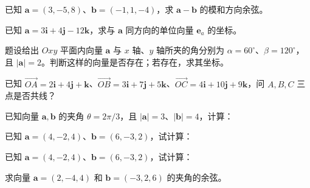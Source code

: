\noindent\begin{minipage}{\textwidth}
已知 $\mathbf a=(3,-5,8)$、$\mathbf b=(-1,1,-4)$，求 $\mathbf a-\mathbf b$ 的模和方向余弦。
\end{minipage}\par\vfill
\newpage
\noindent\begin{minipage}{\textwidth}
已知 $\mathbf a=3\mathbf i+4\mathbf j-12\mathbf k$，求与 $\mathbf a$ 同方向的单位向量 $\mathbf e_a$ 的坐标。
\end{minipage}\par\vfill
\noindent\begin{minipage}{\textwidth}
题设给出 $Oxy$ 平面内向量 $\mathbf a$ 与 $x$ 轴、$y$ 轴所夹的角分别为 $\alpha=60^\circ$、$\beta=120^\circ$，且 $|\mathbf a|=2$。判断这样的向量是否存在；若存在，求其坐标。
\end{minipage}\par\vfill
\noindent\begin{minipage}{\textwidth}
已知 $\overrightarrow{OA}=2\mathbf i+4\mathbf j+\mathbf k$、$\overrightarrow{OB}=3\mathbf i+7\mathbf j+5\mathbf k$、$\overrightarrow{OC}=4\mathbf i+10\mathbf j+9\mathbf k$，问 $A,B,C$ 三点是否共线？
\end{minipage}\par\vfill
\noindent\begin{minipage}{\textwidth}
已知向量 $\mathbf a,\mathbf b$ 的夹角 $\theta=2\pi/3$，且 $|\mathbf a|=3$、$|\mathbf b|=4$，计算：
\end{minipage}\par\vfill
\newpage
\noindent\begin{minipage}{\textwidth}
已知 $\mathbf a=(4,-2,4)$、$\mathbf b=(6,-3,2)$，试计算：
\end{minipage}\par\vfill
\noindent\begin{minipage}{\textwidth}
已知 $\mathbf a=(4,-2,4)$、$\mathbf b=(6,-3,2)$，试计算：
\end{minipage}\par\vfill
\noindent\begin{minipage}{\textwidth}
求向量 $\mathbf a=(2,-4,4)$ 和 $\mathbf b=(-3,2,6)$ 的夹角的余弦。
\end{minipage}\par\vfill

